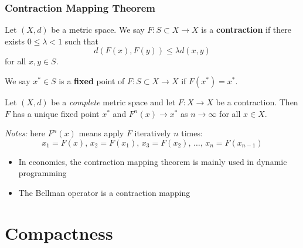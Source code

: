 \documentclass[9pt,aspectratio=169]{beamer}
\begin{document}
\begin{frame}[allowframebreaks]
    \frametitle{Contraction Mapping Theorem}
    \begin{definition}
        Let $(X, d)$ be a metric space. We say $F: S\subset X \to X$ is a
        \textbf{contraction} if there exists $0 \leq \lambda < 1$ such that
        \begin{equation*}
            d(F(x), F(y)) \leq \lambda d(x, y)
        \end{equation*}
        for all $x, y \in S$.
    \end{definition}
    \begin{definition}
        We say $x^*\in S$ is a \textbf{fixed} point of $F: S\subset X \to X$
        if $F(x^*) = x^*$.
    \end{definition}
    \framebreak
    \begin{theorem}
        Let $(X, d)$ be a \emph{complete} metric space and let $F: X \to X$
        be a contraction. Then $F$ has a unique fixed point $x^*$ and $F^n(x)
        \to x^*$ as $n \to \infty$ for all $x \in X$.
    \end{theorem}
    \emph{Notes:} here $F^n(x)$ means apply $F$ iteratively $n$ times:
    \begin{equation*}
        x_1 = F(x),\, x_2 = F(x_1),\, x_3 = F(x_2),\, \ldots,\, x_n = F(x_{n-1})
    \end{equation*}
    \framebreak
    \begin{itemize}
        \item In economics, the contraction mapping theorem is mainly used in
        dynamic programming
        \item The Bellman operator is a contraction mapping 
    \end{itemize}
\end{frame}

\section{Compactness}
\end{document}
